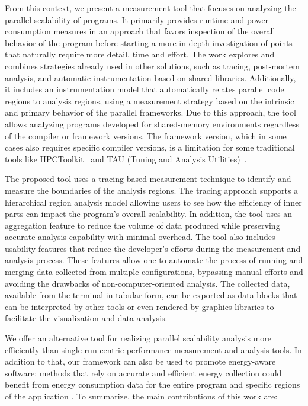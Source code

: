 From this context, we present a measurement tool that focuses on analyzing the parallel scalability of programs. It primarily provides runtime and power consumption measures in an approach that favors inspection of the overall behavior of the program before starting a more in-depth investigation of points that naturally require more detail, time and effort.
The work explores and combines strategies already used in other solutions, such as tracing, post-mortem analysis, and automatic instrumentation based on shared libraries. Additionally, it includes an instrumentation model that automatically relates parallel code regions to analysis regions, using a measurement strategy based on the intrinsic and primary behavior of the parallel frameworks. Due to this approach, the tool allows analyzing programs developed for shared-memory environments regardless of the compiler or framework versions. 
The framework version, which in some cases also requires specific compiler versions, is a limitation for some traditional tools like HPCToolkit~\cite{Adhianto2010} and TAU (Tuning and Analysis Utilities)~\cite{Shende2006}.

The proposed tool uses a tracing-based measurement technique to identify and measure the boundaries of the analysis regions. The tracing approach supports a hierarchical region analysis model allowing users to see how the efficiency of inner parts can impact the program's overall scalability. In addition, the tool uses an aggregation feature to reduce the volume of data produced while preserving accurate analysis capability with minimal overhead. The tool also includes usability features that reduce the developer's efforts during the measurement and analysis process. These features allow one to automate the process of running and merging data collected from multiple configurations, bypassing manual efforts and avoiding the drawbacks of non-computer-oriented analysis. 
The collected data, available from the terminal in tabular form, can be exported as data blocks that can be interpreted by other tools or even rendered by graphics libraries to facilitate the visualization and data analysis.


We offer an alternative tool for realizing parallel scalability analysis more efficiently than single-run-centric performance measurement and analysis tools. In addition to that, our framework can also be used to promote energy-aware software; methods that rely on accurate and efficient energy collection could benefit from energy consumption data for the entire program and specific regions of the application \cite{10.1007/978-3-319-58667-0_22,10.1007/978-3-319-58667-0_21,7016382,10.1145/3321551}. To summarize, the main contributions of this work are:

